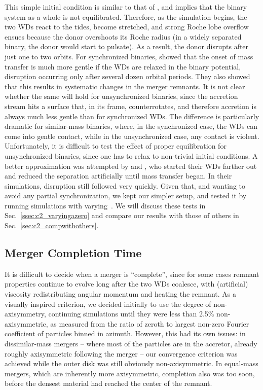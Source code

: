 This simple initial condition is similar to that of \cite{pakm+10}, and implies that the binary system as a whole is not equilibrated.  Therefore, as the simulation begins, the two WDs react to the tides, become stretched, and strong Roche lobe overflow ensues because the donor overshoots its Roche radius (in a widely separated binary, the donor would start to pulsate).  As a result, the donor disrupts after just one to two orbits.  For synchronized binaries, \cite{dan+11} showed that the onset of mass transfer is much more gentle if the WDs are relaxed in the binary potential, disruption occurring only after several dozen orbital periods.  They also showed that this results in systematic changes in the merger remnants.  It is not clear whether the same will hold for unsynchronized binaries, since the accretion stream hits a surface that, in its frame, counterrotates, and therefore accretion is always much less gentle than for synchronized WDs.  The difference is particularly dramatic for similar-mass binaries, where, in the synchronized case, the WDs can come into gentle contact, while in the unsynchronized case, any contact is violent.  Unfortunately, it is difficult to test the effect of proper equilibration for unsynchronized binaries, since one has to relax to non-trivial initial conditions.  A better approximation was attempted by \citeal{loreig09} and \cite{guerig04}, who started their WDs farther out and reduced the separation artificially until mass transfer began.  In their simulations, disruption still followed very quickly.  Given that, and wanting to avoid any partial synchronization, we kept our simpler setup, and tested it by running simulations with varying~{\azero}.  We will discuss these tests in Sec.~\ref{ssec:c2_varyingazero} and compare our results with those of others in Sec.~\ref{sec:c2_compwithothers}.

\subsection{Merger Completion Time}
\label{ssec:c2_mergercomplete}

It is difficult to decide when a merger is ``complete'', since for some cases remnant properties continue to evolve long after the two WDs coalesce, with (artificial) viscosity redistributing angular momentum and heating the remnant.  As a visually inspired criterion, we decided initially to use the degree of non-axisymmetry, continuing simulations until they were less than 2.5\% non-axisymmetric, as measured from the ratio of zeroth to largest non-zero Fourier coefficient of particles binned in azimuth.  However, this had its own issues: in dissimilar-mass mergers --  where most of the particles are in the accretor, already roughly axisymmetric following the merger -- our convergence criterion was achieved while the outer disk was still obviously non-axisymmetric.  In equal-mass mergers, which are inherently more axisymmetric, completion also was too soon, before the densest material had reached the center of the remnant.


